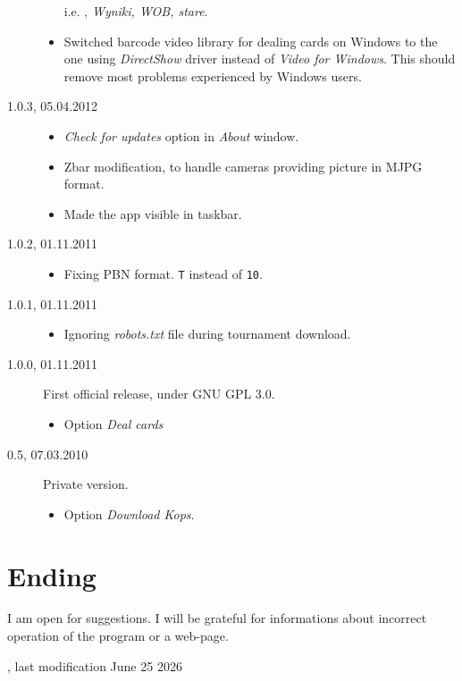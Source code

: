 \documentclass[polish,a4paper,11pt,oneside]{article}
\begin{document}
\begin{description}
\begin{itemize}
        i.e. 
        , {\em Wyniki, WOB, stare}.
  \item Switched barcode video library for dealing cards on Windows
        to the one using
        {\em DirectShow} driver instead of
        {\em Video for Windows}. This should remove most problems
        experienced by Windows users.
  \end{itemize}
\item[1.0.3, 05.04.2012]
  \begin{itemize}
  \item {\em Check for updates} option in {\em About} window.
  \item Zbar modification, to handle cameras providing picture in
        MJPG format.
  \item Made the app visible in taskbar.
  \end{itemize}
\item[1.0.2, 01.11.2011]
  \begin{itemize}
  \item Fixing PBN format. \verb!T! instead of \verb!10!.
  \end{itemize}
\item[1.0.1, 01.11.2011]
  \begin{itemize}
  \item Ignoring {\em robots.txt} file during tournament download.
  \end{itemize}
\item[1.0.0, 01.11.2011]
  First official release, under GNU GPL 3.0.
  \begin{itemize}
  \item Option {\em Deal cards}
  \end{itemize}
\item[0.5, 07.03.2010]
  Private version.
  \begin{itemize}
  \item Option {\em Download Kops}.
  \end{itemize}
\end{description}

\section{Ending}

I am open for suggestions. I will be grateful for informations about incorrect operation of the program or a web-page.

{\setlength{\parindent}{0pt}\small{}
, last modification June 25 2026}
\end{document}
